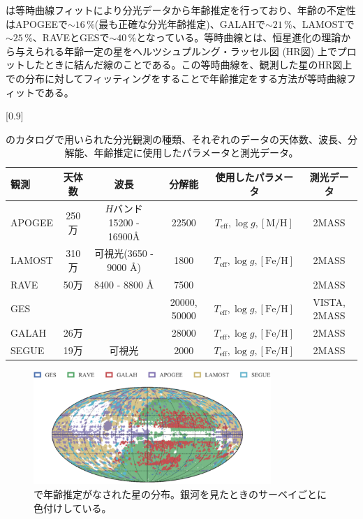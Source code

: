\cite{SD18}は等時曲線フィットにより分光データから年齢推定を行っており、年齢の不定性はAPOGEEで$\sim 16\,\%$(最も正確な分光年齢推定)、GALAHで$\sim 21\,\%$、LAMOSTで$\sim 25\,\%$、RAVEとGESで$\sim 40\,\%$となっている。等時曲線とは、恒星進化の理論から与えられる年齢一定の星をヘルツシュプルング・ラッセル図 (HR図) 上でプロットしたときに結んだ線のことである。この等時曲線を、観測した星のHR図上での分布に対してフィッティングをすることで年齢推定をする方法が等時曲線フィットである。
\begin{table}[htb]
\small
\begin{center}
\scalebox{0.87}[0.9]{
\begin{tabular}{|l||c|c|c|c|c|} \hline
    観測 & 天体数 & 波長 & 分解能 & 使用したパラメータ & 測光データ\\ \hline
    APOGEE & 250万 & $H$バンド 15200 - 16900\AA & 22500 & $T_{\mathrm{eff}},\log g, \mathrm{[M/H]}$ & 2MASS\\
    LAMOST & 310万 & 可視光(3650 - 9000 \AA) & 1800 & $T_{\mathrm{eff}},\log g, \mathrm{[Fe/H]}$ & 2MASS \\
    RAVE & 50万 & 8400 - 8800 \AA & 7500 &   & 2MASS\\
    GES & & & 20000, 50000 & $T_{\mathrm{eff}},\log g, \mathrm{[Fe/H]}$ & VISTA, 2MASS\\
    GALAH & 26万 &  & 28000 & $T_{\mathrm{eff}},\log g, \mathrm{[Fe/H]}$ & 2MASS\\
    SEGUE & 19万 & 可視光　& 2000 & $T_{\mathrm{eff}},\log g, \mathrm{[Fe/H]}$ & 2MASS\\ \hline
\end{tabular}
}
\caption{\cite{SD18}のカタログで用いられた分光観測の種類、それぞれのデータの天体数、波長、分解能、年齢推定に使用したパラメータと測光データ。}
\end{center} \label{spec_dataset}
\end{table}

\begin{figure}[htbp]
\begin{center}
	\includegraphics[width=9cm]{fig/SD18_fig1.pdf}
	\caption{\cite{SD18}で年齢推定がなされた星の分布。銀河を見たときのサーベイごとに色付けしている。}
	\label{fig2}
\end{center}
\end{figure}


